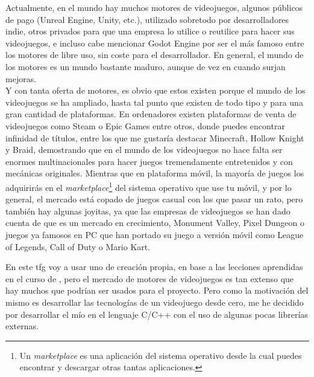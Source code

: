 Actualmente, en el mundo hay muchos motores de videojuegos, algunos públicos de pago (Unreal Engine, Unity, etc.), utilizado sobretodo por desarrolladores indie, otros privados para que una empresa lo utilice o reutilice para hacer sus videojuegos, e incluso cabe mencionar Godot Engine por ser el más famoso entre los motores de libre uso, sin coste para el desarrollador. En general, el mundo de los motores es un mundo bastante maduro, aunque de vez en cuando surjan mejoras.
\\
Y con tanta oferta de motores, es obvio que estos existen porque el mundo de los videojuegos se ha ampliado, hasta tal punto que existen de todo tipo y para una gran cantidad de plataformas. En ordenadores existen plataformas de venta de videojuegos como Steam o Epic Games entre otros, donde puedes encontrar infinidad de títulos, entre los que me gustaría destacar Minecraft, Hollow Knight y Braid, demostrando que en el mundo de los videojuegos no hace falta ser enormes multinacionales para hacer juegos tremendamente entretenidos y con mecánicas originales. Mientras que en plataforma móvil, la mayoría de juegos los adquirirás en el  \textit{marketplace}\footnote{Un \textit{marketplace} es una aplicación del sistema operativo desde la cual puedes encontrar y descargar otras tantas aplicaciones.} del sistema operativo que use tu móvil, y por lo general, el mercado está copado de juegos casual con los que pasar un rato, pero también hay algunas joyitas, ya que las empresas de videojuegos se han dado cuenta de que es un mercado en crecimiento, Monument Valley, Pixel Dungeon o juegos ya famosos en PC que han portado su juego a versión móvil como League of Legends, Call of Duty o Mario Kart.

En este \gls{tfg} voy a usar uno de creación propia, en base a las lecciones aprendidas en el curso de \citep{CursoMotorC++}, pero el mercado de motores de videojuegos es tan extenso que hay muchos que podrían ser usados para el proyecto. Pero como la motivación del mismo es desarrollar las tecnologías de un videojuego desde cero, me he decidido por desarrollar el mío en el lenguaje C/C++ con el uso de algunas pocas librerías externas.

